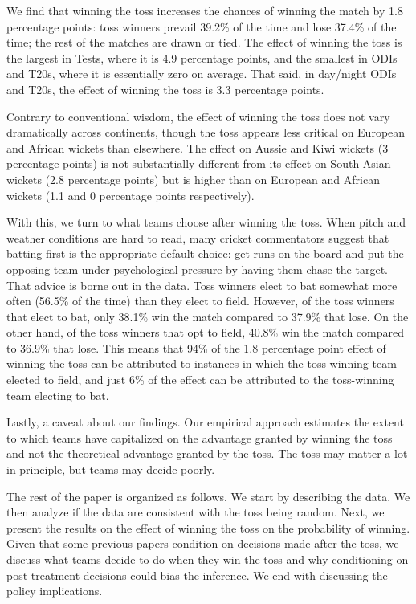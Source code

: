 \documentclass[12pt, letterpaper]{article}
\begin{document}
We find that winning the toss increases the chances of winning the match by 1.8 percentage points: toss winners prevail 39.2\% of the time and lose 37.4\% of the time; the rest of the matches are drawn or tied. The effect of winning the toss is the largest in Tests, where it is 4.9 percentage points, and the smallest in ODIs and T20s, where it is essentially zero on average. That said, in day/night ODIs and T20s, the effect of winning the toss is 3.3 percentage points.

Contrary to conventional wisdom, the effect of winning the toss does not vary dramatically across continents, though the toss appears less critical on European and African wickets than elsewhere. The effect on Aussie and Kiwi wickets (3 percentage points) is not substantially different from its effect on South Asian wickets (2.8 percentage points) but is higher than on European and African wickets (1.1 and 0 percentage points respectively).

With this, we turn to what teams choose after winning the toss. When pitch and weather conditions are hard to read, many cricket commentators suggest that batting first is the appropriate default choice: get runs on the board and put the opposing team under psychological pressure by having them chase the target. That advice is borne out in the data. Toss winners elect to bat somewhat more often (56.5\% of the time) than they elect to field. However, of the toss winners that elect to bat, only 38.1\% win the match compared to 37.9\% that lose. On the other hand, of the toss winners that opt to field, 40.8\% win the match compared to 36.9\% that lose. This means that 94\% of the 1.8 percentage point effect of winning the toss can be attributed to instances in which the toss-winning team elected to field, and just 6\% of the effect can be attributed to the toss-winning team electing to bat.

Lastly, a caveat about our findings. Our empirical approach estimates the extent to which teams have capitalized on the advantage granted by winning the toss and not the theoretical advantage granted by the toss. The toss may matter a lot in principle, but teams may decide poorly.

The rest of the paper is organized as follows. We start by describing the data. We then analyze if the data are consistent with the toss being random. Next, we present the results on the effect of winning the toss on the probability of winning. Given that some previous papers condition on decisions made after the toss, we discuss what teams decide to do when they win the toss and why conditioning on post-treatment decisions could bias the inference. We end with discussing the policy implications.
\end{document}
